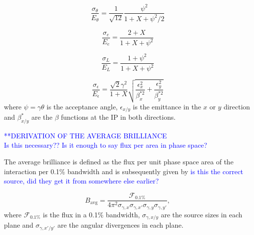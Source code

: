 \documentclass[../main.tex]{subfiles}
\begin{document}
\begin{equation}
\frac{\sigma_{\theta}}{E_{\theta}} = \frac{1}{\sqrt{12}}\frac{\psi^{2}}{1+X+\psi^{2}/2}
\label{eq:collimation_term}
\end{equation}

\begin{equation}
\frac{\sigma_{e}}{E_{e}} = \frac{2+X}{1+X+\psi^{2}}
\label{eq:beam_energy_spread_term}
\end{equation}

\begin{equation}
\frac{\sigma_{L}}{E_{L}} = \frac{1+\psi^{2}}{1+X+\psi^{2}}
\label{eq:laser_energy_spread_term}
\end{equation}

\begin{equation}
\frac{\sigma_{\epsilon}}{E_{\epsilon}} = \frac{\sqrt{2}\gamma^{2}}{1+X}\sqrt{\frac{\epsilon_{x}^{2}}{\beta_{x}^{*2}}+\frac{\epsilon_{y}^{2}}{\beta_{y}^{*2}}}    
\end{equation}
where $\psi = \gamma\theta$ is the acceptance angle, $\epsilon_{x/y}$ is the emittance in the $x$ or $y$ direction and $\beta_{x/y}^{*}$ are the $\beta$ functions at the IP in both directions.

\textcolor{blue}{**DERIVATION OF THE AVERAGE BRILLIANCE \\ Is this necessary?? Is it enough to say flux per area in phase space?}

The average brilliance is defined as the flux per unit phase space area of the interaction per 0.1\% bandwidth and is subsequently given by \cite{krafft2010compton,deitrick2018high} \textcolor{blue}{is this the correct source, did they get it from somewhere else earlier?}

\begin{equation}
B_{\mathrm{avg}} = \frac{\mathcal{F}_{0.1\%}}{4\pi^{2}\sigma_{\gamma,x}\sigma_{\gamma,x'}\sigma_{\gamma,y}\sigma_{\gamma,y'}},
\label{eq:average_brightness}
\end{equation}
where $\mathcal{F}_{0.1\%}$ is the flux in a 0.1\% bandwidth, $\sigma_{\gamma,x/y}$ are the source sizes in each plane and $\sigma_{\gamma,x'/y'}$ are the angular divergences in each plane.
\end{document}

